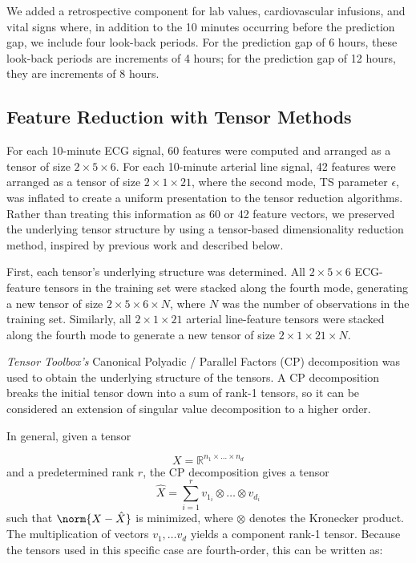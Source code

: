 We added a retrospective component for lab values, cardiovascular infusions, and vital signs where, in addition to the 10 minutes occurring before the prediction gap, we include four look-back periods. For the prediction gap of 6 hours, these look-back periods are increments of 4 hours; for the prediction gap of 12 hours, they are increments of 8 hours.

\subsection*{Feature Reduction with Tensor Methods} \label{sec:methods_tensor}

For each 10-minute ECG signal, 60 features were computed and arranged as a tensor of size $2\times5\times6$. For each 10-minute arterial line signal, 42 features were arranged as a tensor of size $2\times1\times21$, where the second mode, TS parameter $\epsilon$, was inflated to create a uniform presentation to the tensor reduction algorithms. Rather than treating this information as 60 or 42 feature vectors, we preserved the underlying tensor structure by using a tensor-based dimensionality reduction method, inspired by previous work \autocite{hernandez_multimodal_2021} and described below.

First, each tensor's underlying structure was determined. All $2 \times 5 \times 6$ ECG-feature tensors in the training set were stacked along the fourth mode, generating a new tensor of size $2 \times 5 \times 6 \times N$, where $N$ was the number of observations in the training set. Similarly, all $2 \times 1 \times 21$ arterial line-feature tensors were stacked along the fourth mode to generate a new tensor of size $2 \times 1 \times 21 \times N$.

\textit{Tensor Toolbox's} \autocite{tensor_toolbox_gitlab} Canonical Polyadic / Parallel Factors (CP) decomposition \autocite{kolda_tensors} was used to obtain the underlying structure of the tensors. A CP decomposition breaks the initial tensor down into a sum of rank-1 tensors, so it can be considered an extension of singular value decomposition to a higher order. 

In general, given a tensor

\begin{equation*}
    X = \mathbb{R}^{n_1 \times \dots \times n_d}
\end{equation*}
and a predetermined rank $r$, the CP decomposition gives a tensor
\begin{equation*}
    \hat{X} = \sum^{r}_{i=1} v_{1_{i}} \otimes \dots \otimes v_{d_{i}}
\end{equation*}
such that $\norm{X - \hat{X}}$ is minimized, where $\otimes$ denotes the Kronecker product. The multiplication of vectors $v_1, \dots v_d$ yields a component rank-1 tensor. Because the tensors used in this specific case are fourth-order, this can be written as:

